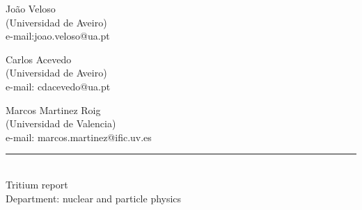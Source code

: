\begin{titlepage}
\begin{center}
\begin{large}
\begin{multicols}{3}

\small João Veloso\\
(Universidad de Aveiro)\\
e-mail:joao.veloso@ua.pt\\
\vspace{1cm} 

Carlos Acevedo\\
(Universidad de Aveiro)\\
e-mail: cdacevedo@ua.pt\\
\vspace{1cm} 

Marcos Martinez Roig\\
(Universidad de Valencia)\\
e-mail: marcos.martinez@ific.uv.es

\end{multicols}

\end{large}
\vspace*{0.3in}
\rule{80mm}{0.1mm}\\
\vspace*{0.1in}
Tritium report\\
Department: nuclear and particle physics\\
\end{center}
\end{titlepage}